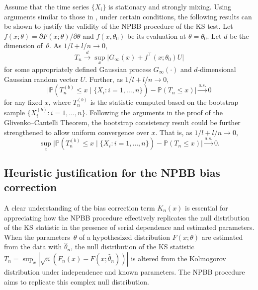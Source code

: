 \documentclass[12pt]{article}
\begin{document}
Assume that the time series $\{X_i\}$ is stationary and
strongly mixing. Using arguments similar to those
in \citet{kunsch1989jackknife}, under certain conditions, the
following results can be shown to
justify the validity of the NPBB procedure of the KS test.
Let $f(x; \theta) = {\partial F(x; \theta)} / {\partial \theta}$
and $f(x, \theta_0)$ be its evaluation at $\theta = \theta_0$.
Let $d$ be the  dimension of~$\theta$.
As $1/l+l/n\rightarrow 0$,
\[
  T_n \overset{d}{\rightarrow}
  \sup_x \big\vert G_{\infty}(x)+f^\top (x;\theta_0)U \big\vert
\]
for some appropriately defined Gaussian process $G_{\infty}(\cdot)$
and $d$-dimensional Gaussian random vector $U$.
Further,  as $1/l+l/n\rightarrow 0$,
\[
  \big\vert \mathbb{P}(T_n^{(b)}\leq x \mid \{X_i: i = 1, \ldots, n\}) -
  \mathbb{P}(T_n\leq x) \big\vert
  \overset{a.s.}{\rightarrow} 0
\]
for any fixed $x$, where $T_n^{(b)}$ is the statistic computed
based on the bootstrap sample $\{X_i^{(b)}: i = 1, \ldots, n\}$.
Following the arguments in the proof of the Glivenko--Cantelli
Theorem, the bootstrap consistency result could be further
strengthened to allow uniform convergence over $x$. That is,
as $1/l+l/n\rightarrow 0$,
\[
  \sup_x \big \vert
  \mathbb{P}(T_n^{(b)}\leq x \mid \{X_i: i = 1, \ldots, n\}) - \mathbb{P}(T_n\leq x) \big\vert
  \overset{a.s.}{\rightarrow} 0.
\]

\subsection{Heuristic justification for the NPBB bias correction}

A clear understanding of the bias correction term $K_n(x)$ is 
essential for appreciating how the NPBB procedure effectively replicates 
the null distribution of the KS statistic in the presence of serial 
dependence and estimated parameters. When the parameters~$\theta$ of a
hypothesized distribution $F(x;\theta)$ are estimated from
the data with $\hat\theta_n$, the null distribution of the KS statistic 
$T_n = \sup_x |\sqrt{n}(F_n(x) - F(x;\hat\theta_n))|$ is altered from
the Kolmogorov distribution under independence and known parameters.
The NPBB procedure aims to replicate this complex null distribution.
\end{document}
